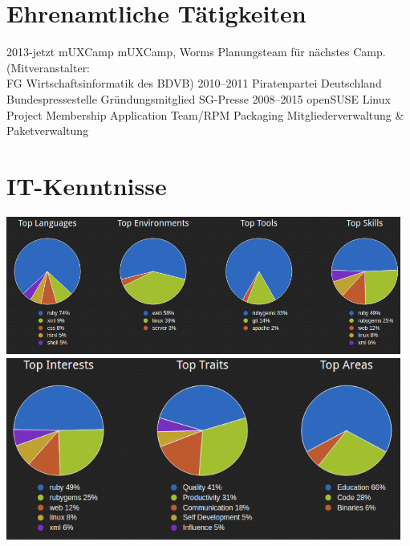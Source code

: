 \documentclass[a4paper]{friggeri-cv} %
\begin{document}
\section{Ehrenamtliche Tätigkeiten}
\begin{entrylist}
\entry
{2013-jetzt}
{mUXCamp}
{mUXCamp, Worms}
{Planungsteam für nächstes Camp. (Mitveranstalter: \\FG Wirtschaftsinformatik des BDVB)}
\entry
{2010--2011}
{Piratenpartei Deutschland}
{Bundespressestelle}
{Gründungsmitglied SG-Presse}
\entry
{2008--2015}
{openSUSE Linux Project}
{Membership Application Team/RPM Packaging}
{Mitgliederverwaltung \& Paketverwaltung}
\end{entrylist}

\newpage

\section{IT-Kenntnisse}

\includegraphics[width=13cm]{../Pictures/Skills1.png} \linebreak
\includegraphics[width=13cm]{../Pictures/Skills2.png}
\end{document}
